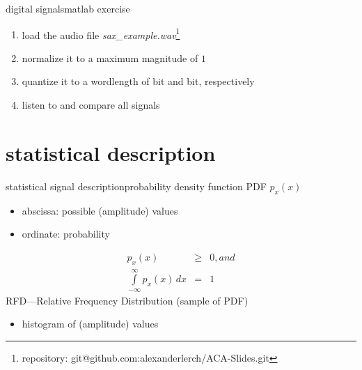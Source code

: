             \begin{frame}{digital signals}{matlab exercise}
                
                \begin{enumerate}
                    \item   load the audio file \textsl{sax\_example.wav}\footnote{repository: git@github.com:alexanderlerch/ACA-Slides.git}
                    \item   normalize it to a maximum magnitude of $1$
                    \item   quantize it to a wordlength of \unit[8]{bit} and \unit[4]{bit}, respectively
                    \item   listen to and compare all signals
                \end{enumerate}
            \end{frame}

        \section{statistical description}
            \begin{frame}{statistical signal description}{probability density function}
                PDF $p_x(x)$
                \begin{itemize}
                    \item	abscissa: possible (amplitude) values
                    \item	ordinate: probability
                \end{itemize}
                \pause
                \begin{eqnarray*}
                    p_x(x)&\geq& 0 , and\\	
                    \int\limits_{-\infty}^{\infty}{p_x(x)\, dx} &=& 1	
                \end{eqnarray*}
                \pause
                RFD---Relative Frequency Distribution (sample of PDF)
                \begin{itemize}
                    \item[] histogram of (amplitude) values
                \end{itemize}
            \end{frame}	
            
